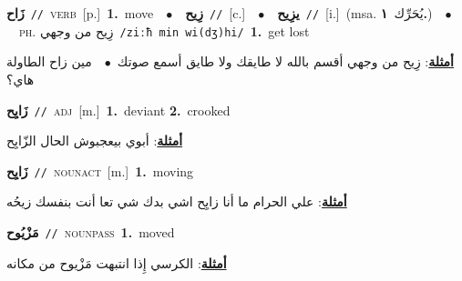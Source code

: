 \documentclass[10pt,a4paper,twoside]{article} %
\begin{document}
\begin{multicols}{2}
{\setlength\topsep{0pt}\textbf{\foreignlanguage{arabic}{زَاح}}\ {\color{gray}\texttt{//}\color{black}}\ \textsc{verb}\ [p.]\ \textbf{1.}~move\ \ $\bullet$\ \ \setlength\topsep{0pt}\textbf{\foreignlanguage{arabic}{زِيح}}\ {\color{gray}\texttt{//}\color{black}}\ [c.]\ \ $\bullet$\ \ \setlength\topsep{0pt}\textbf{\foreignlanguage{arabic}{يزِيح}}\ {\color{gray}\texttt{//}\color{black}}\ [i.]\ \color{gray}(msa. \foreignlanguage{arabic}{يُحَرِّك}~\foreignlanguage{arabic}{\textbf{١.}})\color{black}\ \ $\bullet$\ \ \textsc{ph.} \color{gray} \foreignlanguage{arabic}{زِيح من وجهي}\color{black}\ {\color{gray}\texttt{/{\sffamily ziːħ min wi(dʒ)hi}/}\color{black}}\ \textbf{1.}~get lost\  \begin{flushright}\color{gray}\foreignlanguage{arabic}{\textbf{\underline{\foreignlanguage{arabic}{أمثلة}}}: زِيح من وجهي أقسم بالله لا طايقك ولا طايق أسمع صوتك\ $\bullet$\ \  مين زاح الطاولة هاي؟}\end{flushright}\color{black}} \vspace{2mm}

{\setlength\topsep{0pt}\textbf{\foreignlanguage{arabic}{زَايِح}}\ {\color{gray}\texttt{//}\color{black}}\ \textsc{adj}\ [m.]\ \textbf{1.}~deviant  \textbf{2.}~crooked\  \begin{flushright}\color{gray}\foreignlanguage{arabic}{\textbf{\underline{\foreignlanguage{arabic}{أمثلة}}}: أبوي بيعجبوش الحال الزّايِح}\end{flushright}\color{black}} \vspace{2mm}

{\setlength\topsep{0pt}\textbf{\foreignlanguage{arabic}{زَايِح}}\ {\color{gray}\texttt{//}\color{black}}\ \textsc{noun\textunderscore act}\ [m.]\ \textbf{1.}~moving\  \begin{flushright}\color{gray}\foreignlanguage{arabic}{\textbf{\underline{\foreignlanguage{arabic}{أمثلة}}}: علي الحرام ما أنا زايِح اشي بدك شي تعا أنت بنفسك زيحُه}\end{flushright}\color{black}} \vspace{2mm}

{\setlength\topsep{0pt}\textbf{\foreignlanguage{arabic}{مَزْيُوح}}\ {\color{gray}\texttt{//}\color{black}}\ \textsc{noun\textunderscore pass}\ \textbf{1.}~moved\  \begin{flushright}\color{gray}\foreignlanguage{arabic}{\textbf{\underline{\foreignlanguage{arabic}{أمثلة}}}: الكرسي إِذا انتبهت مَزْيوح من مكانه}\end{flushright}\color{black}} \vspace{2mm}


\end{multicols}
\end{document}
